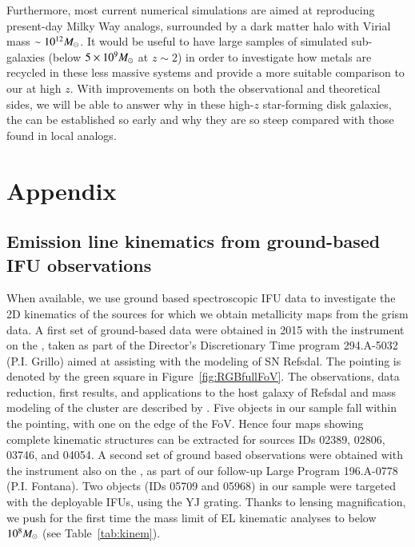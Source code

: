 Furthermore, most current numerical simulations are aimed at reproducing present-day Milky
Way analogs, surrounded by a dark matter halo with Virial mass $\sim10^{12}M_\odot$. It would
be useful to have large samples of simulated sub-\Lstar galaxies (\Mstar below
$5\times10^9M_\odot$ at $z\sim2$) in order to investigate how metals are recycled in these less
massive systems and provide a more suitable comparison to our \mgms at high $z$.  With
improvements on both the observational and theoretical sides, we will be able to answer why
in these high-$z$ star-forming disk galaxies, the \mgs can be established so early and why
they are so steep compared with those found in local analogs.


\renewcommand{\thesection}{\thechapter.A}
\section{Appendix}

\renewcommand{\thesubsection}{\thechapter.A.\arabic{subsection}}
\subsection{Emission line kinematics from ground-based IFU observations}\label{sect:kinem}

When available, we use ground based spectroscopic IFU data
to investigate the 2D kinematics of the sources for which we obtain
metallicity maps from the \hst grism data.  A first
set of ground-based data were obtained in 2015 with the instrument
\muse on the \vlt, taken as part of the Director's Discretionary Time
program 294.A-5032 (P.I. Grillo) aimed at assisting
with the modeling of SN Refsdal.  The \muse pointing is denoted
by the green square in Figure~\ref{fig:RGBfullFoV}.  The observations,
data reduction, first results, and applications to the host galaxy of
Refsdal and mass modeling of the cluster are described by \citet{2016ApJ...822...78G,Karman:2016cg}.
Five objects in our \mg sample fall within the \muse pointing, with one on the edge of the FoV.
Hence four maps showing complete kinematic structures can be extracted for sources IDs 02389, 02806, 03746, and 04054.
A second set of ground based observations were obtained with the instrument \kmos also on the
\vlt, as part of our \glass follow-up \kmos Large Program 196.A-0778 (P.I. Fontana). Two objects (IDs 05709 and 05968) in our
sample were targeted with the deployable IFUs, using the YJ grating.
Thanks to lensing magnification, we push for the first time the mass limit of EL kinematic analyses to below $10^8M_\odot$ (see Table~\ref{tab:kinem}).


